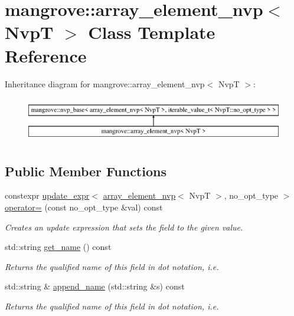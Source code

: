 \hypertarget{classmangrove_1_1array__element__nvp}{}\section{mangrove\+:\+:array\+\_\+element\+\_\+nvp$<$ NvpT $>$ Class Template Reference}
\label{classmangrove_1_1array__element__nvp}
Inheritance diagram for mangrove\+:\+:array\+\_\+element\+\_\+nvp$<$ NvpT $>$\+:\begin{figure}[H]
\begin{center}
\leavevmode
\includegraphics[height=2.000000cm]{classmangrove_1_1array__element__nvp}
\end{center}
\end{figure}
\subsection*{Public Member Functions}
\begin{DoxyCompactItemize}
\item 
constexpr \hyperlink{classmangrove_1_1update__expr}{update\+\_\+expr}$<$ \hyperlink{classmangrove_1_1array__element__nvp}{array\+\_\+element\+\_\+nvp}$<$ NvpT $>$, no\+\_\+opt\+\_\+type $>$ \hyperlink{classmangrove_1_1array__element__nvp_a0faf6d8e40b1d3086057e74330b5a63b}{operator=} (const no\+\_\+opt\+\_\+type \&val) const \hypertarget{classmangrove_1_1array__element__nvp_a0faf6d8e40b1d3086057e74330b5a63b}{}\label{classmangrove_1_1array__element__nvp_a0faf6d8e40b1d3086057e74330b5a63b}

\begin{DoxyCompactList}\small\item\em Creates an update expression that sets the field to the given value. \end{DoxyCompactList}\item 
std\+::string \hyperlink{classmangrove_1_1array__element__nvp_a6894d5b12d43eef079bef55aab1a33ef}{get\+\_\+name} () const 
\begin{DoxyCompactList}\small\item\em Returns the qualified name of this field in dot notation, i.\+e. \end{DoxyCompactList}\item 
std\+::string \& \hyperlink{classmangrove_1_1array__element__nvp_ad5bd39b22ef915118e7cb1a8f6c2b505}{append\+\_\+name} (std\+::string \&s) const 
\begin{DoxyCompactList}\small\item\em Returns the qualified name of this field in dot notation, i.\+e. \end{DoxyCompactList}\end{DoxyCompactItemize}



